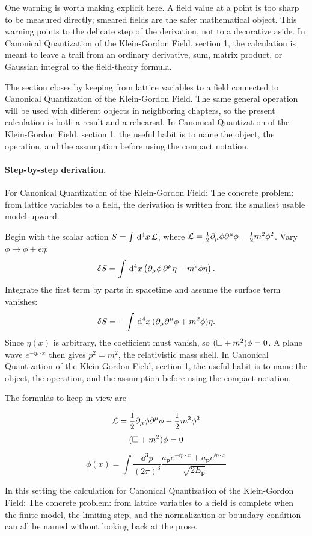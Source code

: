 One warning is worth making explicit here.  A field value at a point is too sharp to be measured directly; smeared fields are the safer mathematical object.  This warning points to the delicate step of the derivation, not to a decorative aside.  In Canonical Quantization of the Klein-Gordon Field, section 1, the calculation is meant to leave a trail from an ordinary derivative, sum, matrix product, or Gaussian integral to the field-theory formula.

The section closes by keeping from lattice variables to a field connected to Canonical Quantization of the Klein-Gordon Field.  The same general operation will be used with different objects in neighboring chapters, so the present calculation is both a result and a rehearsal.  In Canonical Quantization of the Klein-Gordon Field, section 1, the useful habit is to name the object, the operation, and the assumption before using the compact notation.



\paragraph{Step-by-step derivation.}

For Canonical Quantization of the Klein-Gordon Field: The concrete problem: from lattice variables to a field, the derivation is written from the smallest usable model upward.

Begin with the scalar action \(S=\int\,\mathrm d^4x\,\mathcal L\), where \(\mathcal L=\frac12\partial_\mu\phi\partial^\mu\phi-\frac12m^2\phi^2\).  Vary \(\phi\to\phi+\epsilon\eta\):
\[
  \delta S=\int\,\mathrm d^4x\left(\partial_\mu\phi\,\partial^\mu\eta-m^2\phi\eta\right).
\]
Integrate the first term by parts in spacetime and assume the surface term vanishes:
\[
  \delta S=-\int\,\mathrm d^4x\,(\partial_\mu\partial^\mu\phi+m^2\phi)\eta.
\]
Since \(\eta(x)\) is arbitrary, the coefficient must vanish, so \((\Box+m^2)\phi=0\).  A plane wave \(e^{-\ii p\cdot x}\) then gives \(p^2=m^2\), the relativistic mass shell.  In Canonical Quantization of the Klein-Gordon Field, section 1, the useful habit is to name the object, the operation, and the assumption before using the compact notation.

The formulas to keep in view are

\[
  \mathcal L=\frac12\partial_\mu\phi\partial^\mu\phi-\frac12m^2\phi^2
\]
\[
  (\Box+m^2)\phi=0
\]
\[
  \phi(x)=\int\frac{\dd^3p}{(2\pi)^3}\frac{a_{\bm p}e^{-\ii p\cdot x}+a_{\bm p}^\dagger e^{\ii p\cdot x}}{\sqrt{2E_{\bm p}}}
\]

In this setting the calculation for Canonical Quantization of the Klein-Gordon Field: The concrete problem: from lattice variables to a field is complete when the finite model, the limiting step, and the normalization or boundary condition can all be named without looking back at the prose.




